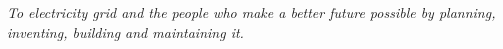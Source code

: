 \clearpage
\vspace*{2.5in}
\begin{center}
\textit{
To electricity grid and the people who make a better future possible by planning, inventing, building and maintaining it.
}
\end{center}
\vspace*{\fill}
